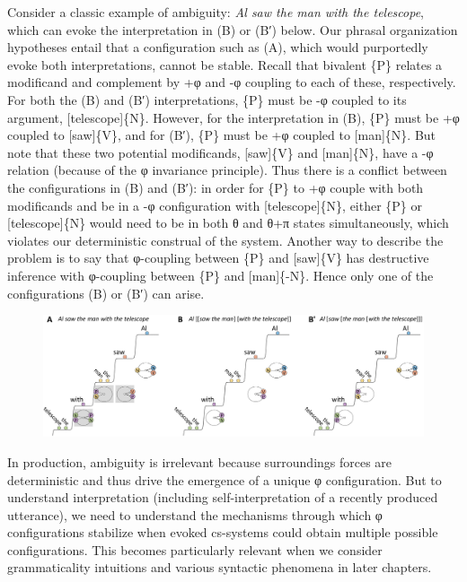   Consider a classic example of ambiguity: \textit{Al saw the man with the telescope}, which can evoke the interpretation in (B) or (B′) below. Our phrasal organization hypotheses entail that a configuration such as (A), which would purportedly evoke both interpretations, cannot be stable. Recall that bivalent \{P\} relates a modificand and complement by +φ and -φ coupling to each of these, respectively. For both the (B) and (B′) interpretations, \{P\} must be -φ coupled to its argument, [telescope]\{N\}. However, for the interpretation in (B), \{P\} must be +φ coupled to [saw]\{V\}, and for (B′), \{P\} must be +φ coupled to [man]\{N\}. But note that these two potential modificands, [saw]\{V\} and [man]\{N\}, have a -φ relation (because of the φ invariance principle). Thus there is a conflict between the configurations in (B) and (B′): in order for \{P\} to +φ couple with both modificands and be in a -φ configuration with [telescope]\{N\}, either \{P\} or [telescope]\{N\} would need to be in both θ and θ+π states simultaneously, which violates our deterministic construal of the system. Another way to describe the problem is to say that φ-coupling between \{P\} and [saw]\{V\} has destructive inference with φ-coupling between \{P\} and [man]\{-N\}. Hence only one of the configurations (B) or (B′) can arise.

  
\begin{figure}
\includegraphics[width=\textwidth]{figures/Tilsen-img89.png}
\caption{\missingcaption}
\label{fig:4:39}
\end{figure}
 

  In production, ambiguity is irrelevant because surroundings forces are deterministic and thus drive the emergence of a unique φ configuration. But to understand interpretation (including self-interpretation of a recently produced utterance), we need to understand the mechanisms through which φ configurations stabilize when evoked cs-systems could obtain multiple possible configurations. This becomes particularly relevant when we consider grammaticality intuitions and various syntactic phenomena in later chapters.

